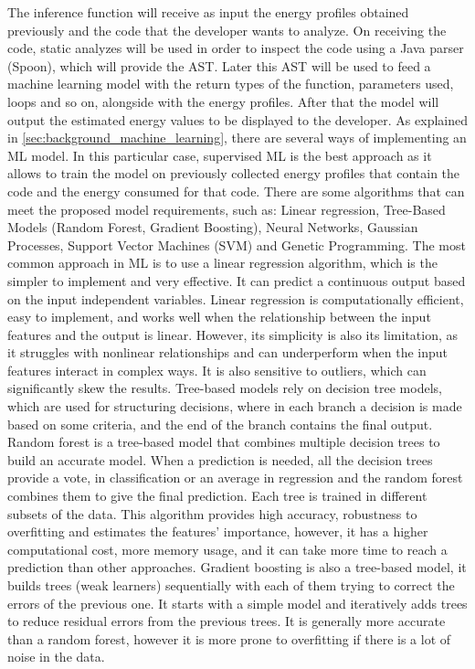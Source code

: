\documentclass[sigplan]{acmart}
\begin{document}
The inference function will receive as input the energy profiles obtained previously and the code that the developer wants to analyze. On receiving the code, static analyzes will be used in order to inspect the code using a Java parser (Spoon), which will provide the AST. Later this AST will be used to feed a machine learning model with the return types of the function, parameters used, loops and so on, alongside with the energy profiles. After that the model will output the estimated energy values to be displayed to the developer.
As explained in \ref{sec:background_machine_learning}, there are several ways of implementing an ML model. In this particular case, supervised ML is the best approach as it allows to train the model on previously collected energy profiles that contain the code and the energy consumed for that code.
There are some algorithms that can meet the proposed model requirements, such as: Linear regression, Tree-Based Models (Random Forest, Gradient Boosting), Neural Networks, Gaussian Processes, Support Vector Machines (SVM) and Genetic Programming.
The most common approach in ML is to use a linear regression algorithm, which is the simpler to implement and very effective. It can predict a continuous output based on the input independent variables. Linear regression is computationally efficient, easy to implement, and works well when the relationship between the input features and the output is linear. However, its simplicity is also its limitation, as it struggles with nonlinear relationships and can underperform when the input features interact in complex ways. It is also sensitive to outliers, which can significantly skew the results.
Tree-based models rely on decision tree models, which are used for structuring decisions, where in each branch a decision is made based on some criteria, and the end of the branch contains the final output. Random forest is a tree-based model that combines multiple decision trees to build an accurate model. When a prediction is needed, all the decision trees provide a vote, in classification or an average in regression and the random forest combines them to give the final prediction. Each tree is trained in different subsets of the data. This algorithm provides high accuracy, robustness to overfitting and estimates the features' importance, however, it has a higher computational cost, more memory usage, and it can take more time to reach a prediction than other approaches.
Gradient boosting is also a tree-based model, it builds trees (weak learners) sequentially with each of them trying to correct the errors of the previous one. It starts with a simple model and iteratively adds trees to reduce residual errors from the previous trees. It is generally more accurate than a random forest, however it is more prone to overfitting if there is a lot of noise in the data.
\end{document}
